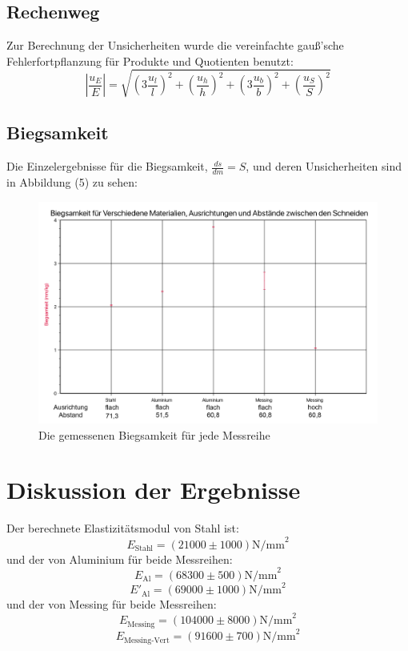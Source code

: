 \documentclass[11pt,a4paper]{article}
\begin{document}
\begin{tcolorbox}[colback=white]
	\subsection{Rechenweg}
	Zur Berechnung der Unsicherheiten wurde die vereinfachte gauß'sche Fehlerfortpflanzung für Produkte und Quotienten benutzt:
	$$
	\left 
	\vert \frac{u_E}{E} \right \vert 
	 = \sqrt{(3\frac{u_l}{l})^2+(\frac{u_h}{h})^2+(3\frac{u_b}{b})^2+(\frac{u_S}{S})^2} $$
	
	
\end{tcolorbox}
\subsection{Biegsamkeit}
Die Einzelergebnisse für die Biegsamkeit, $\frac{ds}{dm} = S$, und deren Unsicherheiten sind in Abbildung (5) zu sehen:

\begin{figure}[h]
	\centering
	\includegraphics[width=\linewidth]{Abb5}
	\caption{Die gemessenen Biegsamkeit für jede Messreihe}
\end{figure}


\section{Diskussion der Ergebnisse}
Der berechnete Elastizitätsmodul von Stahl ist:
$$E_\textrm{Stahl} = (21000 \pm 1000)\textrm{N/mm}^2$$
und der von Aluminium für beide Messreihen:
$$E_\textrm{Al} = (68300 \pm 500)\textrm{N/mm}^2$$
$$E'_\textrm{Al} = (69000 \pm 1000)\textrm{N/mm}^2$$
und der von Messing für beide Messreihen:
$$E_\textrm{Messing} = (104000 \pm 8000)\textrm{N/mm}^2$$
$$E_\textrm{Messing-Vert} = (91600 \pm 700)\textrm{N/mm}^2$$
\end{document}

